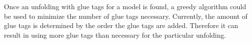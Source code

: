\documentclass[draft,final]{vutinfth} %
\begin{document}
Once an unfolding with glue tags for a model is found, a greedy algorithm could be used to minimize the number of glue tags necessary. Currently, the amount of glue tags is determined by the order the glue tags are added. Therefore it can result in using more glue tags than necessary for the particular unfolding.
\backmatter

\listoffigures %

\cleardoublepage %
\listoftables %

\listofalgorithms
{}

\printindex

\printglossaries



\end{document}
